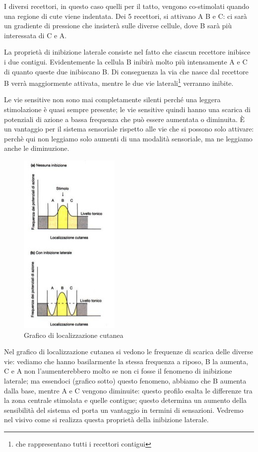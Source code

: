 \documentclass[a4paper,12pt]{article}
\begin{document}
I diversi recettori, in questo caso quelli per il tatto, vengono co-stimolati quando una regione di cute viene indentata. Dei 5 recettori, si attivano A B e C: ci sarà un gradiente di pressione che insisterà sulle diverse cellule, dove B sarà più interessata di C e A. 

La proprietà di inibizione laterale consiste nel fatto che ciascun recettore inibisce i due contigui. Evidentemente la cellula B inibirà molto più intensamente A e C di quanto queste due inibiscano B. Di conseguenza la via che nasce dal recettore B verrà maggiormente attivata, mentre le due vie laterali\footnote{che rappresentano tutti i recettori contigui} verranno inibite.

Le vie sensitive non sono mai completamente silenti perché una leggera stimolazione è quasi sempre presente; le vie sensitive quindi hanno una scarica di potenziali di azione a bassa frequenza che può essere aumentata o diminuita. È un vantaggio per il sistema sensoriale rispetto alle vie che si possono solo attivare: perchè qui non leggiamo solo aumenti di una modalità sensoriale, ma ne leggiamo anche le diminuzione.


\begin{figure}[H]
\centering
\includegraphics[scale=0.6]{immagine/inibizione2.jpg}
\caption{Grafico di localizzazione cutanea}
\end{figure}


Nel grafico di localizzazione cutanea si vedono le frequenze di scarica delle diverse vie: vediamo che hanno basilarmente la stessa frequenza a riposo, B la aumenta, C e A non l'aumenterebbero molto se non ci fosse il fenomeno di inibizione laterale; ma essendoci (grafico sotto) questo fenomeno, abbiamo che B aumenta dalla base, mentre A e C vengono diminuite: questo profilo esalta le differenze tra la zona centrale stimolata e quelle contigue; questo determina un aumento della sensibilità del sistema ed porta un vantaggio in termini di sensazioni. Vedremo nel visivo come si realizza questa proprietà della inibizione laterale. 
\end{document}
